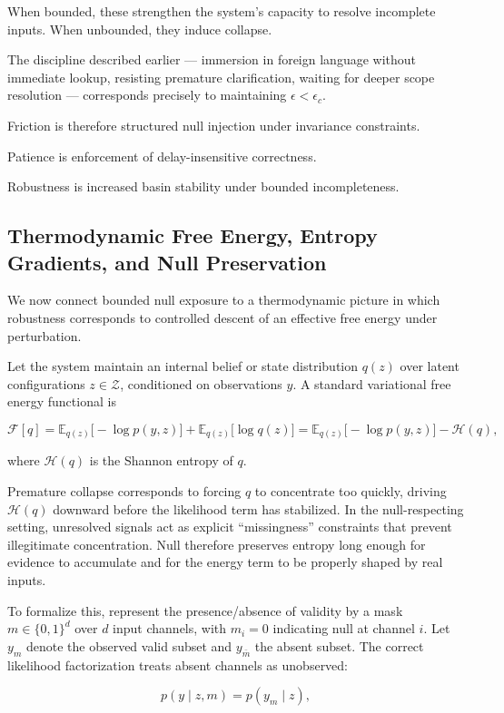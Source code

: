 \documentclass[12pt]{article}
\begin{document}
When bounded, these strengthen the system's capacity to resolve incomplete inputs. When unbounded, they induce collapse.

The discipline described earlier — immersion in foreign language without immediate lookup, resisting premature clarification, waiting for deeper scope resolution — corresponds precisely to maintaining $\epsilon < \epsilon_c$.

Friction is therefore structured null injection under invariance constraints.

Patience is enforcement of delay-insensitive correctness.

Robustness is increased basin stability under bounded incompleteness.
\subsection{Thermodynamic Free Energy, Entropy Gradients, and Null Preservation}

We now connect bounded null exposure to a thermodynamic picture in which robustness corresponds to controlled descent of an effective free energy under perturbation.

Let the system maintain an internal belief or state distribution $q(z)$ over latent configurations $z \in \mathcal{Z}$, conditioned on observations $y$. A standard variational free energy functional is

\[
\mathcal{F}[q]
=
\mathbb{E}_{q(z)}\!\big[-\log p(y,z)\big]
+
\mathbb{E}_{q(z)}\!\big[\log q(z)\big]
=
\mathbb{E}_{q(z)}\!\big[-\log p(y,z)\big]
-
\mathcal{H}(q),
\]

where $\mathcal{H}(q)$ is the Shannon entropy of $q$.

Premature collapse corresponds to forcing $q$ to concentrate too quickly, driving $\mathcal{H}(q)$ downward before the likelihood term has stabilized. In the null-respecting setting, unresolved signals act as explicit ``missingness'' constraints that prevent illegitimate concentration. Null therefore preserves entropy long enough for evidence to accumulate and for the energy term to be properly shaped by real inputs.

To formalize this, represent the presence/absence of validity by a mask $m \in \{0,1\}^d$ over $d$ input channels, with $m_i=0$ indicating null at channel $i$. Let $y_m$ denote the observed valid subset and $y_{\bar m}$ the absent subset. The correct likelihood factorization treats absent channels as unobserved:

\[
p(y \mid z, m) = p(y_m \mid z),
\]
\end{document}

